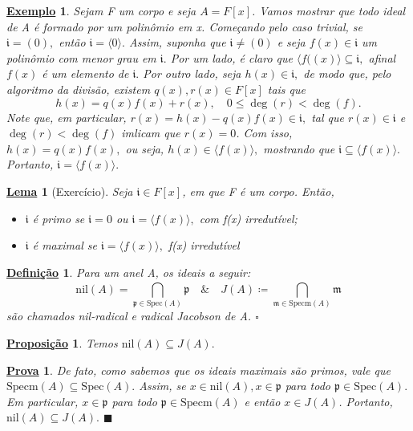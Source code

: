 \documentclass{article}
\newtheorem*{def*}{\underline{Defini\c c\~ao}}
\newtheorem*{lemma*}{\underline{Lema}}
\newtheorem*{prop*}{\underline{Proposi\c c\~ao}}
\newtheorem{example}{\underline{Exemplo}}
\newtheorem*{proof*}{\underline{Prova}}
\renewcommand\qedsymbol{$\blacksquare$}
\begin{document}
\begin{example}
  Sejam F um corpo e seja \(A = F[x]\). Vamos mostrar que todo ideal de A é formado por um polinômio em x.
  Começando pelo caso trivial, se \(\mathfrak{i} = (0),\) então \(\mathfrak{i} = \langle 0 \rangle.\) Assim, suponha que \(\mathfrak{i}\neq (0)\)
  e seja \(f(x)\in \mathfrak{i}\) um polinômio com menor grau em \(\mathfrak{i}.\) Por um lado, é claro que \(\langle f((x) \rangle\subseteq \mathfrak{i},\)
  afinal \(f(x)\) é um elemento de \(\mathfrak{i}.\) Por outro lado, seja \(h(x)\in \mathfrak{i},\) de modo que, pelo algoritmo da divisão, existem \(q(x), r(x)\in F[x]\) tais que 
  \[
    h(x) = q(x)f(x) + r(x),\quad 0\leq \deg{(r)}<\deg{(f)}.
  \]
  Note que, em particular, \(r(x) = h(x)-q(x)f(x)\in \mathfrak{i},\) tal que \(r(x)\in \mathfrak{i}\) e \(\deg{(r)} <\deg{(f)}\) 
  imlicam que \(r(x) = 0\). Com isso, \(h(x) = q(x)f(x),\) ou seja, \(h(x)\in \langle f(x) \rangle,\) mostrando que \(\mathfrak{i}\subseteq \langle f(x) \rangle.\)
  Portanto, \(\mathfrak{i} = \langle f(x) \rangle.\)
\end{example}
\begin{lemma*}[Exercício]
  Seja \(\mathfrak{i}\in F[x]\), em que F é um corpo. Então, 
  \begin{itemize}
    \item[1)] \(\mathfrak{i}\) é primo se \(\mathfrak{i} = 0\) ou \(\mathfrak{i} = \langle f(x) \rangle,\) com f(x) irredutível;
    \item[2)] \(\mathfrak{i}\) é maximal se \(\mathfrak{i} = \langle f(x) \rangle,\) f(x) irredutível
  \end{itemize}
\end{lemma*}
\begin{def*}
  Para um anel A, os ideais a seguir:
  \[
    \mathrm{nil}(A) = \bigcap_{\mathfrak{p}\in \mathrm{Spec}(A)}^{}{\mathfrak{p}}\quad \& \quad J(A)\coloneqq \bigcap_{\mathfrak{m}\in \mathrm{Specm}(A)}^{}{\mathfrak{m}}
  \]
  são chamados nil-radical e radical Jacobson de A. \(\square\)
\end{def*}
\begin{prop*}
  Temos \(\mathrm{nil}(A) \subseteq{J(A)}.\)
\end{prop*}
\begin{proof*}
  De fato, como sabemos que os ideais maximais são primos, vale que \(\mathrm{Specm}(A)\subseteq{\mathrm{Spec}(A)}.\) Assim, se
  \(x\in \mathrm{nil}(A),x\in \mathfrak{p}\) para todo \(\mathfrak{p}\in \mathrm{Spec}(A).\) Em particular, \(x\in \mathfrak{p}\) para todo \(\mathfrak{p}\in \mathrm{Specm}(A)\)
  e então \(x\in J(A)\). Portanto, \(\mathrm{nil}(A) \subseteq{J(A)}.\) \qedsymbol
\end{proof*}
\end{document}

